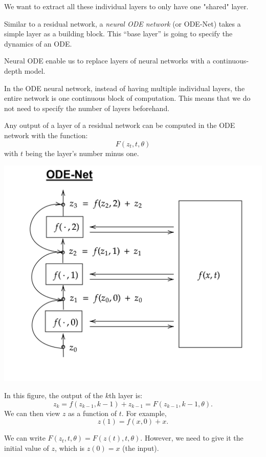 \documentclass[10pt,a4paper]{article}
\theoremstyle{definition}
\theoremstyle{definition}
\theoremstyle{definition}
\begin{document}
We want to extract all these individual layers to only have one "shared" layer.

Similar to a residual network, a \textit{neural ODE network} (or ODE-Net) takes a simple layer as a building block. This “base layer” is going to specify the dynamics of an ODE.

Neural ODE enable us to replace layers of neural networks with a continuous-depth model.

In the ODE neural network, instead of having multiple individual layers, the entire network is one continuous block of computation. This means that we do not need to specify the number of layers beforehand.

Any output of a layer of a residual network can be computed in the ODE network with the function:
$$F(z_t, t, \theta)$$
with $t$ being the layer's number minus one.

\begin{center}
\includegraphics[scale=0.18]{ODENet.png}
\end{center}

In this figure, the output of the $k$th layer is:
$$z_k = f(z_{k-1}, k-1) + z_{k-1} = F(z_{k-1}, k-1, \theta).$$
We can then view $z$ as a function of $t$. For example,
$$z(1) = f(x, 0) + x.$$

We can write $F(z_t, t, \theta) = F(z(t), t, \theta)$. However, we need to give it the initial value of $z$, which is $z(0) = x$ (the input).

~
\end{document}
